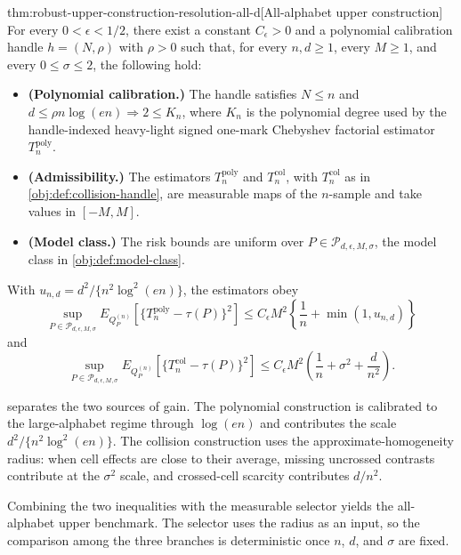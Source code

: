 \documentclass[11pt]{article}
\begin{document}
\begin{theoremv}{thm:robust-upper-construction-resolution-all-d}[All-alphabet upper construction]
For every \(0<\epsilon<1/2\), there exist a constant \(C_\epsilon>0\) and a polynomial calibration handle \(h=(N,\rho)\) with \(\rho>0\) such that, for every \(n,d\ge 1\), every \(M\ge 1\), and every \(0\le \sigma\le 2\), the following hold:
\begin{itemize}
\item \textbf{(Polynomial calibration.)} The handle satisfies \(N\le n\) and \(d\le \rho n\log(en)\Rightarrow 2\le K_n\), where \(K_n\) is the polynomial degree used by the handle-indexed heavy-light signed one-mark Chebyshev factorial estimator \(T_n^{\mathrm{poly}}\).
\item \textbf{(Admissibility.)} The estimators \(T_n^{\mathrm{poly}}\) and \(T_n^{\mathrm{col}}\), with \(T_n^{\mathrm{col}}\) as in \cref{obj:def:collision-handle}, are measurable maps of the \(n\)-sample and take values in \([-M,M]\).
\item \textbf{(Model class.)} The risk bounds are uniform over \(P\in\mathcal P_{d,\epsilon,M,\sigma}\), the model class in \cref{obj:def:model-class}.
\end{itemize}
With \(u_{n,d}=d^2/\{n^2\log^2(en)\}\), the estimators obey
\[
\sup_{P\in\mathcal P_{d,\epsilon,M,\sigma}}
E_{Q_P^{(n)}}\!\left[\{T_n^{\mathrm{poly}}-\tau(P)\}^2\right]
\le
C_\epsilon M^2\left\{\frac1n+\min(1,u_{n,d})\right\}
\]
and
\[
\sup_{P\in\mathcal P_{d,\epsilon,M,\sigma}}
E_{Q_P^{(n)}}\!\left[\{T_n^{\mathrm{col}}-\tau(P)\}^2\right]
\le
C_\epsilon M^2\left(\frac1n+\sigma^2+\frac{d}{n^2}\right).
\]
\end{theoremv}

 separates the two sources of gain. The polynomial construction is calibrated to the large-alphabet regime through \(\log(en)\) and contributes the scale \(d^2/\{n^2\log^2(en)\}\). The collision construction uses the approximate-homogeneity radius: when cell effects are close to their average, missing uncrossed contrasts contribute at the \(\sigma^2\) scale, and crossed-cell scarcity contributes \(d/n^2\).

Combining the two inequalities with the measurable selector yields the all-alphabet upper benchmark. The selector uses the radius as an input, so the comparison among the three branches is deterministic once \(n\), \(d\), and \(\sigma\) are fixed.
\end{document}
